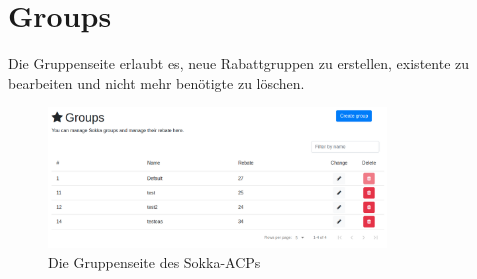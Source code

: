 \section{Groups}

Die Gruppenseite erlaubt es, neue Rabattgruppen zu erstellen, existente zu bearbeiten und nicht mehr benötigte zu löschen.

\begin{figure}[ht]
    \centering
    \includegraphics[width=0.8\textwidth]{images/ACP/groups.png}
    \caption{Die Gruppenseite des Sokka-ACPs}
\end{figure}
